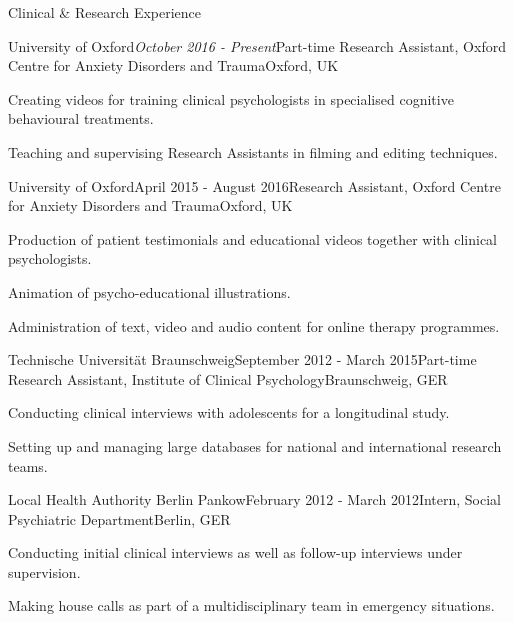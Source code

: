 \documentclass{resume} %
\begin{document}

\begin{rSection}{Clinical \& Research Experience}

\begin{rSubsection}{University of Oxford}{\em October 2016 - Present}{Part-time Research Assistant, Oxford Centre for Anxiety Disorders and Trauma}{Oxford, UK}
\item Creating videos for training clinical psychologists in specialised cognitive behavioural treatments.
\item Teaching and supervising Research Assistants in filming and editing techniques.
\end{rSubsection}

\begin{rSubsection}{University of Oxford}{April 2015 - August 2016}{Research Assistant, Oxford Centre for Anxiety Disorders and Trauma}{Oxford, UK}
\item Production of patient testimonials and educational videos together with clinical psychologists.
\item Animation of psycho-educational illustrations.
\item Administration of text, video and audio content for online therapy programmes.
\end{rSubsection}

\begin{rSubsection}{Technische Universit{\"a}t Braunschweig}{September 2012 - March 2015}{Part-time Research Assistant, Institute of Clinical Psychology}{Braunschweig, GER}
\item Conducting clinical interviews with adolescents for a longitudinal study.
\item Setting up and managing large databases for national and international research teams.
\end{rSubsection}

\begin{rSubsection}{Local Health Authority Berlin Pankow}{February 2012 - March 2012}{Intern, Social Psychiatric Department}{Berlin, GER}
\item Conducting initial clinical interviews as well as follow-up interviews under supervision.
\item Making house calls as part of a multidisciplinary team in emergency situations.

\end{rSubsection}

\end{rSection}
\end{document}
